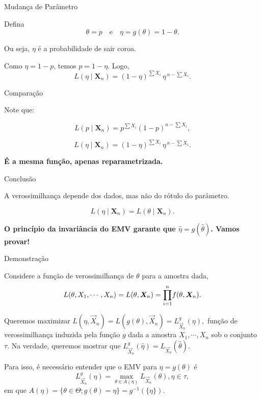 \documentclass[12pt]{beamer}
\begin{document}
\begin{frame}{Mudança de Parâmetro}
	\begin{block}{}
		\justifying
	Defina
	\[
	\theta = p \quad \text{e} \quad \eta = g(\theta) = 1-\theta.
	\]
	
	Ou seja, $\eta$ é a probabilidade de sair coroa.
	
	Como $\eta = 1-p$, temos $p = 1-\eta$. Logo,
	\[
	L(\eta \mid \mathbf{X}_n) 
	= (1-\eta)^{\sum X_i} \, \eta^{\,n-\sum X_i}.
	\]
\end{block}
\end{frame}

\begin{frame}{Comparação}
	\begin{block}{}
		\justifying
	Note que:
	
	\[
	L(p \mid \mathbf{X}_n) = p^{\sum X_i}(1-p)^{n-\sum X_i},
	\]
	
	\[
	L(\eta \mid \mathbf{X}_n) = (1-\eta)^{\sum X_i}\,\eta^{\,n-\sum X_i}.
	\]
	
	\bigskip
	\centering
	\textbf{É a mesma função, apenas reparametrizada.}
\end{block}
\end{frame}

\begin{frame}{Conclusão}
	\begin{block}{}
		\justifying
	A verossimilhança depende dos dados, mas não do rótulo do parâmetro.
	
	\[
	L(\eta \mid \mathbf{X}_n) = L(\theta \mid \mathbf{X}_n).
	\]
	
	\bigskip
	\centering
	\textbf{O princípio da invariância do EMV garante que $\hat{\eta}=g(\hat{\theta})$. Vamos provar!}
\end{block}
\end{frame}


\begin{frame}{Demonstração}
	\begin{block}{}
		\justifying
Considere a função de verossimilhança de $\theta$ para a amostra dada, $$L(\theta,X_{1},\cdots, X_{n})=L(\theta,\bm{X}_{n})=\displaystyle {\displaystyle \prod_{i=1}^{n}} f(\theta,\bm{X}_{n}).$$

Queremos maximizar $L(\eta,\vec{X}_{n})=L(g(\theta),\vec{X}_{n})=L_{\vec{X}_{n}}^{g}(\eta),$ função de verossimilhança induzida pela função $g$ dada a amostra $X_{1},\cdots, X_{n}$ sob o conjunto $\tau.$ Na verdade, queremos mostrar que $L_{\vec{X}_{n}}^{g}(\hat{\eta})=L_{\vec{X}_{n}}(\hat{\theta}).$
	\end{block}
	\pause
		\begin{block}{}
		\justifying
		Para isso, é necessário entender que o EMV para $\eta=g(\theta)$ é $$L_{\vec{X}_{n}}^{g}(\eta)={\displaystyle \max_{\theta \in A(\eta)}} L_{\vec{X}_{n}}(\theta), \eta\in \tau,$$ em que $A(\eta)=\{\theta\in\Theta;g(\theta)=\eta\}=g^{-1}(\{\eta\}).$
	\end{block}
\end{frame}
\end{document}
